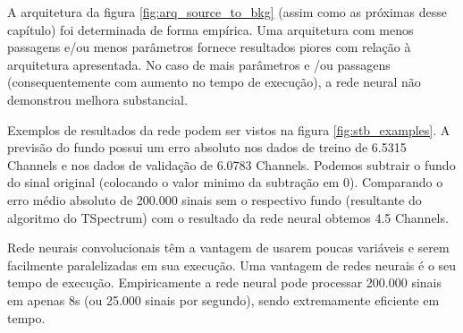 \documentclass[a4paper,12pt,oneside]{book}
\begin{document}

\par A arquitetura da figura \ref{fig:arq_source_to_bkg} (assim como as próximas desse capítulo) foi determinada de forma empírica. Uma arquitetura com menos passagens e/ou menos parâmetros fornece resultados piores com relação à arquitetura apresentada. No caso de mais parâmetros e /ou passagens (consequentemente com aumento no tempo de execução), a rede neural não demonstrou melhora substancial.

\par Exemplos de resultados da rede podem ser vistos na figura \ref{fig:stb_examples}. A previsão do fundo possui um erro absoluto nos dados de treino de 6.5315 Channels e nos dados de validação de 6.0783 Channels. Podemos subtrair o fundo do sinal original (colocando o valor minimo da subtração em 0). Comparando o erro médio absoluto de 200.000 sinais sem o respectivo fundo (resultante do algoritmo do TSpectrum) com o resultado da rede neural obtemos 4.5 Channels.

\par Rede neurais convolucionais têm a vantagem de usarem poucas variáveis e serem facilmente paralelizadas em sua execução. Uma vantagem de redes neurais é o seu tempo de execução. Empiricamente a rede neural pode processar 200.000 sinais em apenas 8s (ou 25.000 sinais por segundo), sendo extremamente eficiente em tempo.
\end{document}

